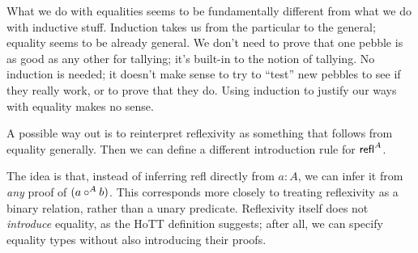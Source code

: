 \documentclass{article}
\begin{document}
What we do with equalities seems to be fundamentally different from
what we do with inductive stuff.  Induction takes us from the
particular to the general; equality seems to be already general.  We
don't need to prove that one pebble is as good as any other for
tallying; it's built-in to the notion of tallying.  No induction is
needed; it doesn't make sense to try to ``test'' new pebbles to see if
they really work, or to prove that they do.  Using induction to
justify our ways with equality makes no sense.

\bigskip

\noindent
A possible way out is to reinterpret reflexivity as something that
follows from equality generally.  Then we can define a different
introduction rule for \(\textsf{refl}^A\).

\medskip


\medskip


\medskip

The idea is that, instead of inferring \textsf{refl} directly from
\(a{:}A\), we can infer it from \emph{any} proof of \((a\circ^A b)\).
This corresponds more closely to treating reflexivity as a binary
relation, rather than a unary predicate.  Reflexivity itself does not
\emph{introduce} equality, as the HoTT definition suggests; after all,
we can specify equality types without also introducing their proofs.
\end{document}
